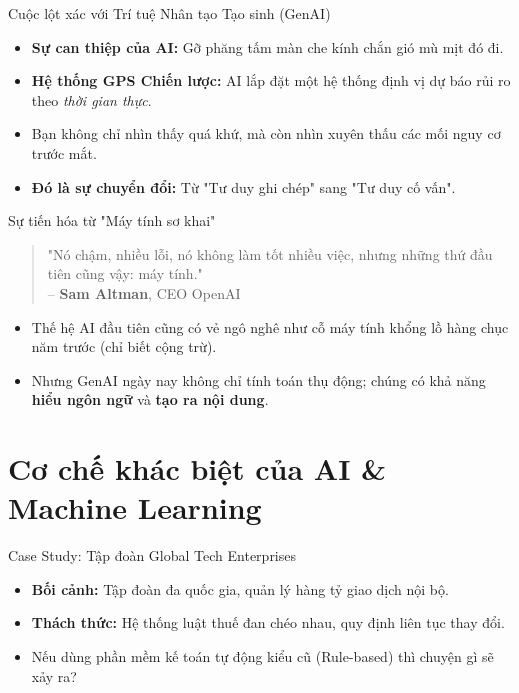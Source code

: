 \documentclass[aspectratio=169,12pt]{beamer}
\begin{document}
\begin{frame}{Cuộc lột xác với Trí tuệ Nhân tạo Tạo sinh (GenAI)}
    \begin{itemize}
        \item \textbf{Sự can thiệp của AI:} Gỡ phăng tấm màn che kính chắn gió mù mịt đó đi.
        \item \textbf{Hệ thống GPS Chiến lược:} AI lắp đặt một hệ thống định vị dự báo rủi ro theo \textit{thời gian thực}.
        \item Bạn không chỉ nhìn thấy quá khứ, mà còn nhìn xuyên thấu các mối nguy cơ trước mắt.
        \item \textbf{Đó là sự chuyển đổi:} Từ "Tư duy ghi chép" sang "Tư duy cố vấn".
    \end{itemize}
\end{frame}

\begin{frame}{Sự tiến hóa từ "Máy tính sơ khai"}
    \begin{quote}
        "Nó chậm, nhiều lỗi, nó không làm tốt nhiều việc, nhưng những thứ đầu tiên cũng vậy: máy tính."\\
        \vspace{0.2cm}
        -- \textbf{Sam Altman}, CEO OpenAI
    \end{quote}
    \begin{itemize}
        \item Thế hệ AI đầu tiên cũng có vẻ ngô nghê như cỗ máy tính khổng lồ hàng chục năm trước (chỉ biết cộng trừ).
        \item Nhưng GenAI ngày nay không chỉ tính toán thụ động; chúng có khả năng \textbf{hiểu ngôn ngữ} và \textbf{tạo ra nội dung}.
    \end{itemize}
\end{frame}


\section{Cơ chế khác biệt của AI \& Machine Learning}
\begin{frame}
    \tableofcontents[currentsection]
\end{frame}

\begin{frame}{Case Study: Tập đoàn Global Tech Enterprises}
    \begin{itemize}
        \item \textbf{Bối cảnh:} Tập đoàn đa quốc gia, quản lý hàng tỷ giao dịch nội bộ.
        \item \textbf{Thách thức:} Hệ thống luật thuế đan chéo nhau, quy định liên tục thay đổi.
        \item Nếu dùng phần mềm kế toán tự động kiểu cũ (Rule-based) thì chuyện gì sẽ xảy ra?
    \end{itemize}
\end{frame}
\end{document}
